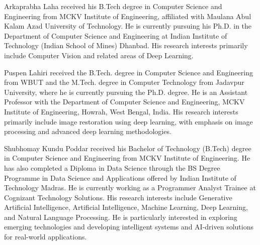 

%
%





Arkaprabha Laha received his B.Tech degree in Computer Science and Engineering from MCKV Institute of Engineering, affiliated with Maulana Abul Kalam Azad University of Technology. He is currently pursuing his Ph.D. in the Department of Computer Science and Engineering at Indian Institute of Technology (Indian School of Mines) Dhanbad. His research interests primarily include Computer Vision and related areas of Deep Learning.
\endbio

Puspen Lahiri received the B.Tech. degree in Computer Science and Engineering from WBUT and the M.Tech. degree in Computer Technology from Jadavpur University, where he is currently pursuing the Ph.D. degree. He is an Assistant Professor with the Department of Computer Science and Engineering, MCKV Institute of Engineering, Howrah, West Bengal, India. His research interests primarily include image restoration using deep learning, with emphasis on image processing and advanced deep learning methodologies.
\endbio

Shubhomay Kundu Poddar received his Bachelor of Technology (B.Tech) degree in Computer Science and Engineering from MCKV Institute of Engineering. He has also completed a Diploma in Data Science through the BS Degree Programme in Data Science and Applications offered by Indian Institute of Technology Madras. He is currently working as a Programmer Analyst Trainee at Cognizant Technology Solutions. His research interests include Generative Artificial Intelligence, Artificial Intelligence, Machine Learning, Deep Learning, and Natural Language Processing. He is particularly interested in exploring emerging technologies and developing intelligent systems and AI-driven solutions for real-world applications.
\endbio

